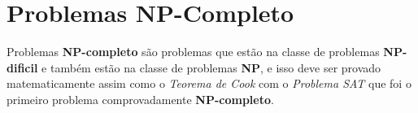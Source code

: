 \section{Problemas NP-Completo}
Problemas \textbf{NP-completo} são problemas que estão na classe de problemas \textbf{NP-dificil} e também estão na classe de problemas \textbf{NP}, e isso deve ser provado matematicamente assim como o \textit{Teorema de Cook} com o \textit{Problema SAT} que foi o primeiro problema comprovadamente \textbf{NP-completo}.

